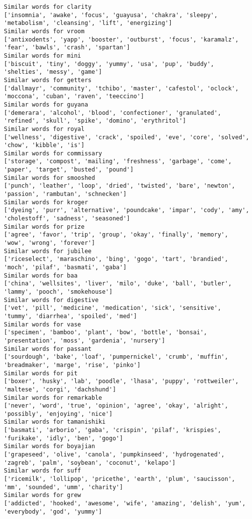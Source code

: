 \documentclass[11pt]{article}
\begin{document}
\begin{Verbatim}[commandchars=\\\{\}]
Similar words for clarity
['insomnia', 'awake', 'focus', 'guayusa', 'chakra', 'sleepy', 'metabolism', 'cleansing', 'lift', 'energizing']
Similar words for vroom
['antixodents', 'yapp', 'booster', 'outburst', 'focus', 'karamalz', 'fear', 'bawls', 'crash', 'spartan']
Similar words for mini
['biscuit', 'tiny', 'doggy', 'yummy', 'usa', 'pup', 'buddy', 'shelties', 'messy', 'game']
Similar words for getters
['dallmayr', 'community', 'tchibo', 'master', 'cafestol', 'oclock', 'moccona', 'cuban', 'raven', 'teeccino']
Similar words for guyana
['demerara', 'alcohol', 'blood', 'confectioner', 'granulated', 'refined', 'skull', 'spike', 'domino', 'erythritol']
Similar words for royal
['wellness', 'digestive', 'crack', 'spoiled', 'eve', 'core', 'solved', 'chow', 'kibble', 'is']
Similar words for commissary
['storage', 'compost', 'mailing', 'freshness', 'garbage', 'come', 'paper', 'target', 'busted', 'pound']
Similar words for smooshed
['punch', 'leather', 'loop', 'dried', 'twisted', 'bare', 'newton', 'passion', 'rambutan', 'schnecken']
Similar words for kroger
['dyeing', 'purr', 'alternative', 'poundcake', 'impar', 'cody', 'amy', 'cholestoff', 'sadness', 'seasoned']
Similar words for prize
['agree', 'favor', 'trip', 'group', 'okay', 'finally', 'memory', 'wow', 'wrong', 'forever']
Similar words for jubilee
['riceselect', 'maraschino', 'bing', 'gogo', 'tart', 'brandied', 'moch', 'pilaf', 'basmati', 'gaba']
Similar words for baa
['china', 'wellsites', 'liver', 'milo', 'duke', 'ball', 'butler', 'lammy', 'pooch', 'smokehouse']
Similar words for digestive
['vet', 'pill', 'medicine', 'medication', 'sick', 'sensitive', 'tummy', 'diarrhea', 'spoiled', 'med']
Similar words for vase
['specimen', 'bamboo', 'plant', 'bow', 'bottle', 'bonsai', 'presentation', 'moss', 'gardenia', 'nursery']
Similar words for passant
['sourdough', 'bake', 'loaf', 'pumpernickel', 'crumb', 'muffin', 'breadmaker', 'marge', 'rise', 'pinko']
Similar words for pit
['boxer', 'husky', 'lab', 'poodle', 'lhasa', 'puppy', 'rottweiler', 'maltese', 'corgi', 'dachshund']
Similar words for remarkable
['never', 'word', 'true', 'opinion', 'agree', 'okay', 'alright', 'possibly', 'enjoying', 'nice']
Similar words for tamanishiki
['basmati', 'arborio', 'gaba', 'crispin', 'pilaf', 'krispies', 'furikake', 'idly', 'ben', 'gogo']
Similar words for boyajian
['grapeseed', 'olive', 'canola', 'pumpkinseed', 'hydrogenated', 'zagreb', 'palm', 'soybean', 'coconut', 'kelapo']
Similar words for suff
['ricemilk', 'lollipop', 'pricethe', 'earth', 'plum', 'saucisson', 'mm', 'sounded', 'umm', 'charity']
Similar words for grew
['addicted', 'hooked', 'awesome', 'wife', 'amazing', 'delish', 'yum', 'everybody', 'god', 'yummy']

\end{Verbatim}
\end{document}
